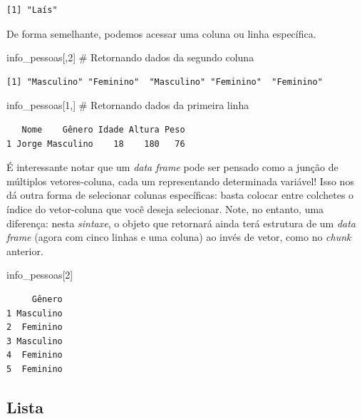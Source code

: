 \documentclass[
  letterpaper,
  DIV=11,
  numbers=noendperiod]{scrreprt}
\newenvironment{Shaded}{\begin{snugshade}}{\end{snugshade}}
\newcommand{\CommentTok}[1]{\textcolor[rgb]{0.37,0.37,0.37}{#1}}
\newcommand{\DecValTok}[1]{\textcolor[rgb]{0.68,0.00,0.00}{#1}}
\newcommand{\NormalTok}[1]{\textcolor[rgb]{0.00,0.23,0.31}{#1}}
\begin{document}
\begin{verbatim}
[1] "Laís"
\end{verbatim}

De forma semelhante, podemos acessar uma coluna ou linha específica.

\begin{Shaded}
\begin{Highlighting}[]
\NormalTok{info\_pessoas[,}\DecValTok{2}\NormalTok{] }\CommentTok{\# Retornando dados da segundo coluna}
\end{Highlighting}
\end{Shaded}

\begin{verbatim}
[1] "Masculino" "Feminino"  "Masculino" "Feminino"  "Feminino" 
\end{verbatim}

\begin{Shaded}
\begin{Highlighting}[]
\NormalTok{info\_pessoas[}\DecValTok{1}\NormalTok{,] }\CommentTok{\# Retornando dados da primeira linha}
\end{Highlighting}
\end{Shaded}

\begin{verbatim}
   Nome    Gênero Idade Altura Peso
1 Jorge Masculino    18    180   76
\end{verbatim}

É interessante notar que um \emph{data frame} pode ser pensado como a
junção de múltiplos vetores-coluna, cada um representando determinada
variável! Isso nos dá outra forma de selecionar colunas específicas:
basta colocar entre colchetes o índice do vetor-coluna que você deseja
selecionar. Note, no entanto, uma diferença: nesta \emph{sintaxe}, o
objeto que retornará ainda terá estrutura de um \emph{data frame} (agora
com cinco linhas e uma coluna) ao invés de vetor, como no \emph{chunk}
anterior.

\begin{Shaded}
\begin{Highlighting}[]
\NormalTok{info\_pessoas[}\DecValTok{2}\NormalTok{]}
\end{Highlighting}
\end{Shaded}

\begin{verbatim}
     Gênero
1 Masculino
2  Feminino
3 Masculino
4  Feminino
5  Feminino
\end{verbatim}

\subsection{Lista}\label{lista}
\end{document}
